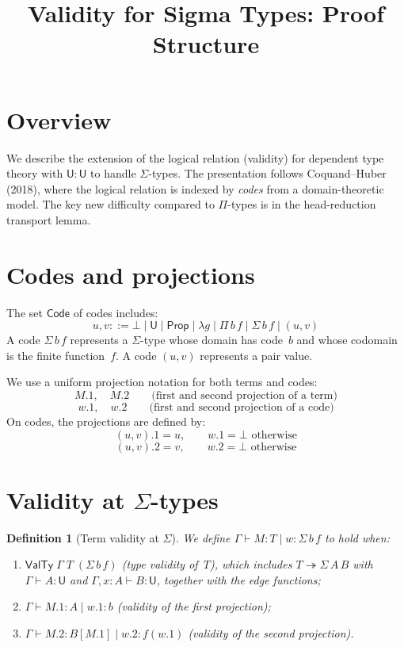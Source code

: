 \documentclass[11pt]{article}
\title{Validity for Sigma Types: Proof Structure}
\author{}
\date{}
\newcommand{\Type}{\mathsf{U}}
\newcommand{\Prop}{\mathsf{Prop}}
\newcommand{\ValTy}{\mathsf{ValTy}}
\newcommand{\HasType}{\vdash}
\newcommand{\HeadRed}{\twoheadrightarrow}
\newcommand{\FinEl}{\mathsf{Code}}
\newcommand{\Bot}{\bot}
\newcommand{\pj}[2]{#1\mbox{.}#2}
\newtheorem{definition}{Definition}
\begin{document}
\maketitle

\section{Overview}

We describe the extension of the logical relation (validity) for dependent
type theory with $\Type:\Type$ to handle $\Sigma$-types.  The presentation
follows Coquand--Huber (2018), where the logical relation is indexed by
\emph{codes} from a domain-theoretic model.  The key new difficulty compared
to $\Pi$-types is in the head-reduction transport lemma.

\section{Codes and projections}

The set $\FinEl$ of codes includes:
\[
  u,v ::= \Bot \mid \Type \mid \Prop \mid \lambda g \mid \Pi\,b\,f
         \mid \Sigma\,b\,f \mid (u,v)
\]
A code $\Sigma\,b\,f$ represents a $\Sigma$-type whose domain has code~$b$
and whose codomain is the finite function~$f$.
A code $(u,v)$ represents a pair value.

We use a uniform projection notation for both terms and codes:
\[
  \pj{M}{1},\quad \pj{M}{2} \qquad\text{(first and second projection of a term)}
\]
\[
  \pj{w}{1},\quad \pj{w}{2} \qquad\text{(first and second projection of a code)}
\]
On codes, the projections are defined by:
\[
  \pj{(u,v)}{1} = u, \qquad \pj{w}{1} = \Bot \text{ otherwise}
\]
\[
  \pj{(u,v)}{2} = v, \qquad \pj{w}{2} = \Bot \text{ otherwise}
\]

\section{Validity at $\Sigma$-types}

\begin{definition}[Term validity at $\Sigma$]
We define $\Gamma \HasType M : T \mid w : \Sigma\,b\,f$ to hold when:
\begin{enumerate}
\item $\ValTy\;\Gamma\;T\;(\Sigma\,b\,f)$ (type validity of~$T$), which
  includes $T \HeadRed \Sigma\,A\,B$ with $\Gamma \HasType A : \Type$ and
  $\Gamma,x\!:\!A \HasType B : \Type$, together with the edge functions;
\item $\Gamma \HasType \pj{M}{1} : A \mid \pj{w}{1} : b$ (validity of the
  first projection);
\item $\Gamma \HasType \pj{M}{2} : B[\pj{M}{1}] \mid \pj{w}{2} : f(\pj{w}{1})$
  (validity of the second projection).
\end{enumerate}
\end{definition}
\end{document}
